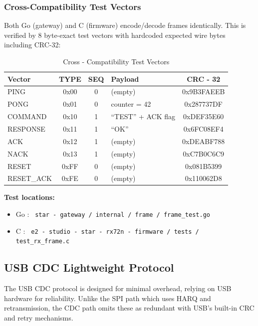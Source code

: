 \subsubsection{Cross-Compatibility Test Vectors}

Both Go (gateway) and C (firmware) encode/decode frames identically. This is verified by 8 byte-exact test vectors with hardcoded expected wire bytes including CRC-32:

\begin{table}[h]
\centering
\begin{tabular}{
  lccl c
}
\toprule
\textbf{Vector} & \textbf{TYPE} & \textbf{SEQ} & \textbf{Payload} & \textbf{CRC - 32
}
\\
\midrule PING & 0x00 & 0 & (empty) & 0x9B3FAEEB \\
PONG & 0x01 & 0 &counter =
    42 & 0x287737DF \\
COMMAND & 0x10 & 1 & ``TEST'' + ACK flag &
    0xDEF35E60 \\
RESPONSE & 0x11 & 1 & ``OK'' & 0x6FC08EF4 \\
ACK & 0x12 & 1 &
    (empty) & 0xDEABF788 \\
NACK & 0x13 & 1 & (empty) & 0xC7B0C6C9 \\
RESET &
    0xFF & 0 & (empty) & 0x081B5399 \\
RESET\_ACK & 0xFE & 0 & (empty) &
    0x110062D8 \\
\bottomrule
\end{tabular}
\caption { Cross - Compatibility Test Vectors}
\label {
tab:
  cross_compat_vectors
}
\end{table}

\textbf{Test locations:}
\begin{itemize}
\item Go : \texttt { star - gateway / internal / frame / frame\_test.go}
\item C : \texttt {
  e2 - studio - star - rx72n - firmware / tests / test\_rx\_frame.c
}
\end{itemize}

\subsection{USB CDC Lightweight Protocol}

The USB CDC protocol is designed for minimal overhead, relying on USB hardware for reliability. Unlike the SPI path which uses HARQ and retransmission, the CDC path omits these as redundant with USB's built-in CRC and retry mechanisms.

